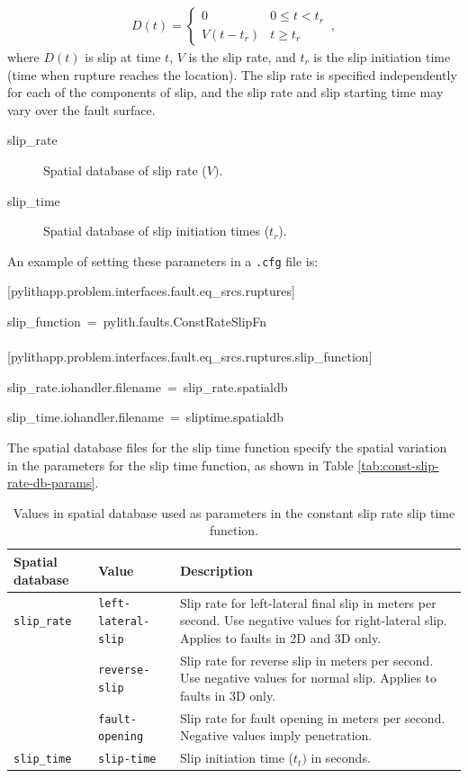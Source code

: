 \begin{gather}
D(t)=\left\{ \begin{array}{cc}
0 & 0\leq t<t_{r}\\
V(t-t_{r}) & t\ge t_{r}
\end{array}\right.\,,
\end{gather}
where $D(t)$ is slip at time $t$, $V$ is the slip rate, and $t_{r}$
is the slip initiation time (time when rupture reaches the location).
The slip rate is specified independently for each of the components
of slip, and the slip rate and slip starting time may vary over the
fault surface.
\begin{description}
\item [{slip\_rate}] Spatial database of slip rate ($V)$.
\item [{slip\_time}] Spatial database of slip initiation times ($t_{r}$).
\end{description}
An example of setting these parameters in a \texttt{.cfg} file is:
\begin{lyxcode}
{[}pylithapp.problem.interfaces.fault.eq\_srcs.ruptures{]}

slip\_function~=~pylith.faults.ConstRateSlipFn~\\
~\\
{[}pylithapp.problem.interfaces.fault.eq\_srcs.ruptures.slip\_function{]}

slip\_rate.iohandler.filename~=~slip\_rate.spatialdb

slip\_time.iohandler.filename~=~sliptime.spatialdb
\end{lyxcode}
The spatial database files for the slip time function specify the
spatial variation in the parameters for the slip time function, as
shown in Table \vref{tab:const-slip-rate-db-params}.

\noindent \begin{center}
\begin{table}[H]
\noindent \centering{}\caption{\label{tab:const-slip-rate-db-params}Values in spatial database used
as parameters in the constant slip rate slip time function.}
\medskip{}
\begin{tabular}{|l|l|>{\raggedright}p{2.5in}|}
\hline 
\textbf{Spatial database} & \textbf{Value} & \textbf{Description}\tabularnewline
\hline 
\hline 
\texttt{slip\_rate} & \texttt{left-lateral-slip} & Slip rate for left-lateral final slip in meters per second. Use negative
values for right-lateral slip. Applies to faults in 2D and 3D only.\tabularnewline
 & \texttt{reverse-slip} & Slip rate for reverse slip in meters per second. Use negative values
for normal slip. Applies to faults in 3D only.\tabularnewline
 & \texttt{fault-opening} & Slip rate for fault opening in meters per second. Negative values
imply penetration.\tabularnewline
\hline 
\texttt{slip\_time} & \texttt{slip-time} & Slip initiation time ($t_{t})$ in seconds.\tabularnewline
\hline 
\end{tabular}
\end{table}

\par\end{center}


